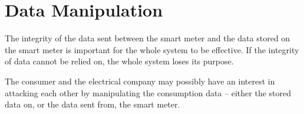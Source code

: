 \section{Data Manipulation}
The integrity of the data sent between the smart meter and the data stored on the smart meter is important for the whole system to be effective.
If the integrity of data cannot be relied on, the whole system loses its purpose.

The consumer and the electrical company may possibly have an interest in attacking each other by manipulating the consumption data -- either the stored data on, or the data sent from, the smart meter.

